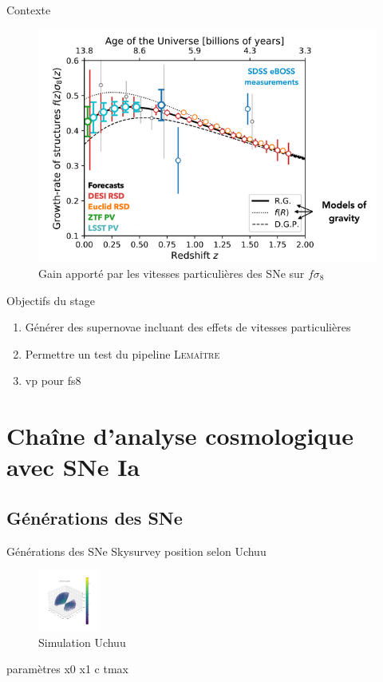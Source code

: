 \documentclass{beamer}
\newcommand{\lemaitre}{\textsc{Lemaître}\xspace}
\begin{document}
\begin{frame}{Contexte}
\begin{figure}
	\centering
	\includegraphics[height=0.7\textheight]{figures/fs8.png}
	\caption{Gain apporté par les vitesses particulières des SNe sur $f\sigma_8$}
\end{figure}
\end{frame}

\begin{frame}{Objectifs du stage}
\begin{enumerate}
\item Générer des supernovae incluant des effets de vitesses particulières
\item Permettre un test du pipeline \lemaitre
\item vp pour fs8
\end{enumerate}
\end{frame}

\section{Chaîne d'analyse cosmologique avec SNe Ia}



\subsection{Générations des SNe}

\begin{frame}{Générations des SNe}
Skysurvey
position selon Uchuu
\begin{figure}
	\centering
	\includegraphics[height=2cm, trim={2cm 2cm 2cm 2cm}, clip]{figures/Uchuu.png}
	\caption{Simulation Uchuu}
\end{figure}
paramètres x0 x1 c tmax
\end{frame}
\end{document}
